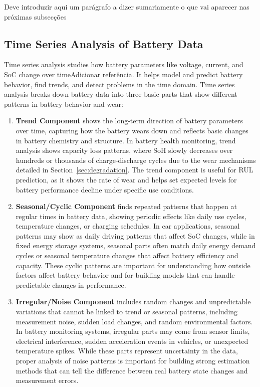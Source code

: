 
\color{Red}
Deve introduzir aqui um parágrafo a dizer sumariamente o que vai aparecer nas próximas subsecções
\color{Black}



\subsection{Time Series Analysis of Battery Data}

Time series analysis studies how battery parameters like voltage, current, and SoC change over time\color{Red}Adicionar referência\color{Black}. It helps model and predict battery behavior, find trends, and detect problems in the time domain. Time series analysis breaks down battery data into three basic parts that show different patterns in battery behavior and wear:

\begin{enumerate}
    \item \textbf{Trend Component} shows the long-term direction of battery parameters over time, capturing how the battery wears down and reflects basic changes in battery chemistry and structure. In battery health monitoring, trend analysis shows capacity loss patterns, where SoH slowly decreases over hundreds or thousands of charge-discharge cycles due to the wear mechanisms detailed in Section~\ref{sec:degradation}. The trend component is useful for RUL prediction, as it shows the rate of wear and helps set expected levels for battery performance decline under specific use conditions.
   \item  \textbf{Seasonal/Cyclic Component} finds repeated patterns that happen at regular times in battery data, showing periodic effects like daily use cycles, temperature changes, or charging schedules. In car applications, seasonal patterns may show as daily driving patterns that affect SoC changes, while in fixed energy storage systems, seasonal parts often match daily energy demand cycles or seasonal temperature changes that affect battery efficiency and capacity. These cyclic patterns are important for understanding how outside factors affect battery behavior and for building models that can handle predictable changes in performance.
   \item \textbf{Irregular/Noise Component} includes random changes and unpredictable variations that cannot be linked to trend or seasonal patterns, including measurement noise, sudden load changes, and random environmental factors. In battery monitoring systems, irregular parts may come from sensor limits, electrical interference, sudden acceleration events in vehicles, or unexpected temperature spikes. While these parts represent uncertainty in the data, proper analysis of noise patterns is important for building strong estimation methods that can tell the difference between real battery state changes and measurement errors.
\end{enumerate}



